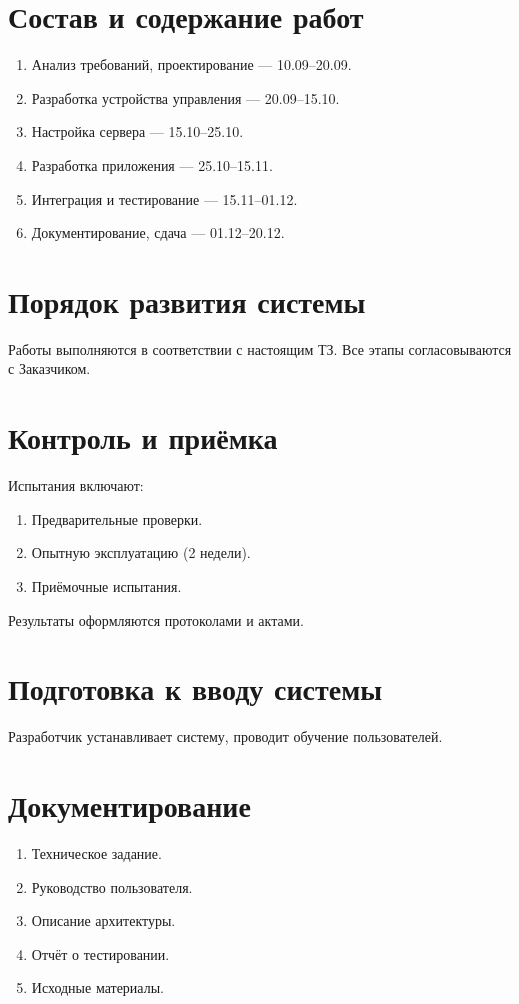 \documentclass[oneside,a4paper,14pt]{extarticle}
\begin{document}
\section{Состав и содержание работ}
\begin{enumerate}
    \item Анализ требований, проектирование — 10.09–20.09.
    \item Разработка устройства управления — 20.09–15.10.
    \item Настройка сервера — 15.10–25.10.
    \item Разработка приложения — 25.10–15.11.
    \item Интеграция и тестирование — 15.11–01.12.
    \item Документирование, сдача — 01.12–20.12.
\end{enumerate}

\section{Порядок развития системы}
Работы выполняются в соответствии с настоящим ТЗ. Все этапы согласовываются с Заказчиком.

\section{Контроль и приёмка}
Испытания включают:
\begin{enumerate}
    \item Предварительные проверки.
    \item Опытную эксплуатацию (2 недели).
    \item Приёмочные испытания.
\end{enumerate}

Результаты оформляются протоколами и актами.

\section{Подготовка к вводу системы}
Разработчик устанавливает систему, проводит обучение пользователей.

\section{Документирование}
\begin{enumerate}
    \item Техническое задание.
    \item Руководство пользователя.
    \item Описание архитектуры.
    \item Отчёт о тестировании.
    \item Исходные материалы.
\end{enumerate}
\end{document}
